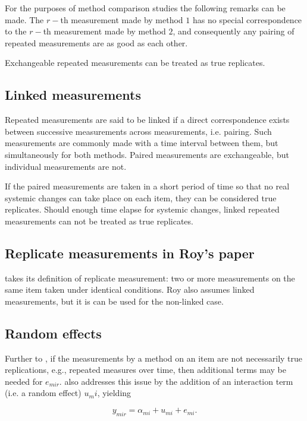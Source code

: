 For the purposes of method comparison studies the following remarks can be made. The $r-$th measurement made by method $1$ has no special correspondence to the $r-$th measurement made by method $2$, and consequently any pairing of repeated measurements are as good as each other.

Exchangeable repeated measurements can be treated as true replicates.
\subsection{Linked measurements}
Repeated measurements are said to be linked if a direct correspondence exists between successive measurements across measurements, i.e. pairing. Such measurements are commonly made with a time interval between them, but simultaneously for both methods. Paired measurements are exchangeable, but individual measurements are not.

If the paired measurements are taken
in a short period of time so that no real systemic changes can take place on each item, they can be considered true replicates.
Should enough time elapse for systemic changes, linked repeated measurements can not be treated as true replicates.

\subsection{Replicate measurements in Roy's paper}
\citet{Roy} takes its definition of replicate measurement: two or more measurements on the same item taken
under identical conditions. Roy also assumes linked measurements, but it is can be used for the non-linked case.

\newpage
\subsection{Random effects}

Further to \citet{barnhart}, if the measurements by a method on an item are not necessarily true replications, e.g., repeated measures over time, then additional terms may be needed for $e_{mir}$. \citet{bxc2008} also addresses this issue by the addition of an interaction term (i.e. a random effect) $u_mi$, yielding

\[ y_{mir} =  \alpha_{mi} + u_{mi} + e_{mi}.  \]

